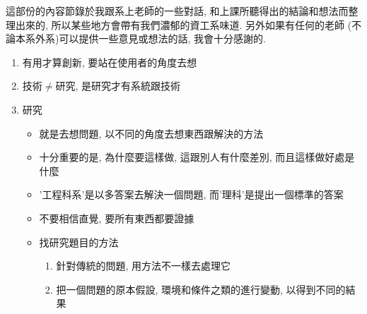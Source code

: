 

這部份的內容節錄於我跟系上老師的一些對話, 和上課所聽得出的結論和想法而整理出來的, 所以某些地方會帶有我們濃郁的資工系味道. 另外如果有任何的老師 (不論本系外系)可以提供一些意見或想法的話, 我會十分感謝的.


\begin{enumerate}
  \item
  {
    有用才算創新, 要站在使用者的角度去想
  } %

  \item
  {
    技術$\neq$研究, 是研究才有系統跟技術
  } %

  \item
  {
    研究
    \begin{itemize}
      \item
      {
        就是去想問題, 以不同的角度去想東西跟解決的方法
      } %

      \item
      {
        十分重要的是, 為什麼要這樣做, 這跟別人有什麼差別, 而且這樣做好處是什麼
      } %

      \item
      {
        '工程科系'是以多答案去解決一個問題, 而'理科'是提出一個標準的答案
      } %

      \item
      {
        不要相信直覺, 要所有東西都要證據
      } %

      \item
      {
        找研究題目的方法
      } %

      \begin{enumerate}
        \item
        {
          針對傳統的問題, 用方法不一樣去處理它
        } %

        \item
        {
          把一個問題的原本假設, 環境和條件之類的進行變動, 以得到不同的結果
        } %
      \end{enumerate}
    \end{itemize}
  } %
\end{enumerate}

